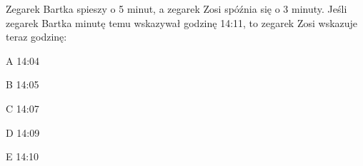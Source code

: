 \begin{tresc}
Zegarek Bartka spieszy o 5 minut, a zegarek Zosi spóźnia się o 3 minuty. Jeśli zegarek Bartka minutę temu wskazywał godzinę 14:11, to zegarek Zosi wskazuje teraz godzinę:
\end{tresc}
\begin{wariant}{A} 14:04 \end{wariant}
\begin{wariant}{B} 14:05 \end{wariant}
\begin{wariant}{C} 14:07 \end{wariant}
\begin{wariant}{D} 14:09 \end{wariant}
\begin{wariant}{E} 14:10 \end{wariant}
